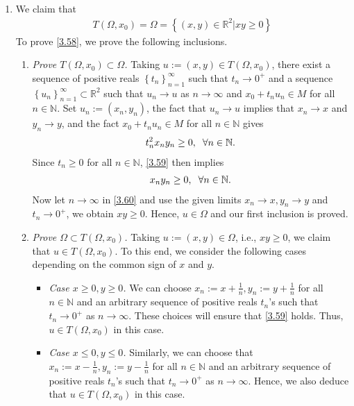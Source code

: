 \documentclass[a4paper]{article}
\numberwithin{equation}{section}
\begin{document}
\begin{enumerate}
\item We claim that
\begin{align}
\label{3.58}
T\left( {\Omega ,{x_0}} \right) = \Omega  = \left\{ {\left( {x,y} \right) \in {\mathbb{R}^2}|xy \ge 0} \right\}
\end{align}
To prove \eqref{3.58}, we prove the following inclusions.
\begin{enumerate}
\item \textit{Prove $T\left( {\Omega ,{x_0}} \right) \subset \Omega $.} Taking $u:=\left(x,y\right)\in T\left(\Omega,x_0\right)$, there exist a sequence of positive reals $\left\{ {{t_n}} \right\}_{n = 1}^\infty $ such that $t_n\to 0^+$ and a sequence $\left\{ {{u_n}} \right\}_{n = 1}^\infty  \subset {\mathbb{R}^2}$ such that $u_n\to u$ as $n\to \infty$ and $x_0+t_nu_n\in M$ for all $n\in \mathbb{N}$. Set $u_n:=\left(x_n,y_n\right)$, the fact that $u_n\to u$ implies that $x_n\to x$ and $y_n\to y$, and the fact $x_0+t_nu_n\in M$ for all $n\in \mathbb{N}$ gives
\begin{align}
\label{3.59}
t_n^2{x_n}{y_n} \ge 0,\hspace{0.2cm}\forall n \in \mathbb{N}.
\end{align}
Since $t_n\ge 0$ for all $n\in \mathbb{N}$, \eqref{3.59} then implies
\begin{align}
\label{3.60}
{x_n}{y_n} \ge 0,\hspace{0.2cm}\forall n \in \mathbb{N}.
\end{align}
Now let $n\to \infty$ in \eqref{3.60} and use the given limits $x_n\to x, y_n\to y$ and $t_n\to 0^+$, we obtain $xy\ge 0$. Hence, $u\in \Omega$ and our first inclusion is proved.
\item \textit{Prove $\Omega  \subset T\left( {\Omega ,{x_0}} \right)$.} Taking $u:=\left(x,y\right)\in \Omega$, i.e., $xy\ge 0$, we claim that $u\in T\left(\Omega,x_0\right)$. To this end, we consider the following cases depending on the common sign of $x$ and $y$.
\begin{itemize}
\item \textit{Case $x\ge 0,y\ge 0$.} We can choose $x_n:=x+\frac{1}{n},y_n:=y+\frac{1}{n}$ for all $n\in \mathbb{N}$ and an arbitrary sequence of positive reals $t_n$'s such that $t_n\to 0^+$ as $n\to \infty$. These choices will ensure that \eqref{3.59} holds. Thus, $u\in T\left(\Omega,x_0\right)$ in this case.
\item \textit{Case $x\le 0,y\le 0$.} Similarly, we can choose that $x_n:=x-\frac{1}{n},y_n:=y-\frac{1}{n}$ for all $n\in \mathbb{N}$ and an arbitrary sequence of positive reals $t_n$'s such that $t_n\to 0^+$ as $n\to \infty$. Hence, we also deduce that $u\in T\left(\Omega,x_0\right)$ in this case.

\end{itemize}
\end{enumerate}
\end{enumerate}
\end{document}
